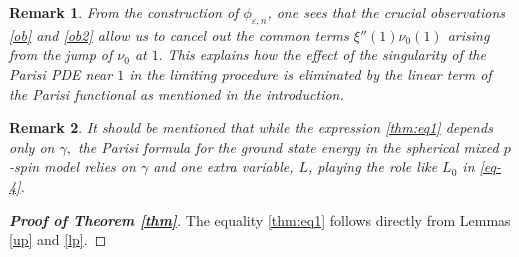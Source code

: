 \documentclass[12pt]{article}
\newtheorem{remark}{\bf Remark}
\newenvironment{Proof of lemma}{\noindent{\bf Proof of Lemma}}{\hfill$\Box$\newline}
\newenvironment{Proof of theorem}{\noindent{\bf Proof of Theorem}}{\hfill{\footnotesize${\square}$}\newline}
\newenvironment{Proof of theorems}{\noindent{\bf Proof of Theorems}}{\hfill$\Box$\newline}
\newenvironment{Proof of proposition}{\noindent{\bf Proof of Proposition}}{\hfill$\Box$\newline}
\newenvironment{Proof of propositions}{\noindent{\bf Proof of Propositions}}{\hfill$\Box$\newline}
\newenvironment{Proof of exercise}{\noindent{\it Proof of Exercise:}}{\hfill$\Box$}
\begin{document}
\begin{remark}
	\rm From the construction of $\phi_{\varepsilon,n}$, one sees that the crucial observations \eqref{ob} and \eqref{ob2} allow us to cancel out the common terms $\xi''(1)\nu_0(1)$ arising from the jump of $\nu_0$ at $1.$ This explains how the effect of the singularity of the Parisi PDE near $1$ in the limiting procedure is eliminated by the linear term of the Parisi functional as mentioned in the introduction.
\end{remark}
	
\begin{remark}\rm
It should be mentioned that while the expression \eqref{thm:eq1} depends only on $\gamma,$ the Parisi formula for the ground state energy in the spherical mixed $p$-spin model \cite{ArnabChen15,JT} relies on $\gamma$ and one extra variable, $L$, playing the role like $L_0$ in \eqref{eq-4}. 
\end{remark}


\begin{proof}[\bf Proof of Theorem \ref{thm}]
	The equality \eqref{thm:eq1} follows directly from Lemmas \ref{up} and \ref{lp}. 
\end{proof}
\end{document}
